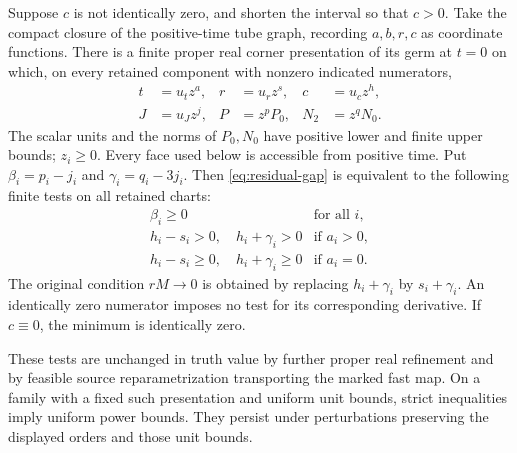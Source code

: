 \begin{theorem}\label{thm:divisorial}
Suppose $c$ is not identically zero, and shorten the interval so that $c>0$.
Take the compact closure of the positive-time tube graph, recording $a,b,r,c$
as coordinate functions. There is a finite proper real corner presentation of
its germ at $t=0$ on which, on every retained component with nonzero indicated
numerators,
\begin{equation}\label{eq:divisor-data}
 \begin{aligned}
 t&=u_t z^a,& r&=u_r z^s,& c&=u_c z^h,\\
 J&=u_J z^j,& P&=z^p P_0,& N_2&=z^q N_0.
 \end{aligned}
\end{equation}
The scalar units and the norms of $P_0,N_0$ have positive lower and finite
upper bounds; $z_i\ge0$. Every face used below is accessible from positive
time. Put $\beta_i=p_i-j_i$ and $\gamma_i=q_i-3j_i$.
Then \eqref{eq:residual-gap} is equivalent to the following finite tests on
all retained charts:
\begin{equation}\label{eq:divisor-tests}
 \begin{array}{ll}
 \beta_i\ge0 &\text{for all }i,\\
 h_i-s_i>0,\quad h_i+\gamma_i>0 &\text{if }a_i>0,\\
 h_i-s_i\ge0,\quad h_i+\gamma_i\ge0 &\text{if }a_i=0.
 \end{array}
\end{equation}
The original condition $rM\to0$ is obtained by replacing $h_i+\gamma_i$
by $s_i+\gamma_i$. An identically zero numerator imposes no test for its
corresponding derivative. If $c\equiv0$, the minimum is identically zero.

These tests are unchanged in truth value by further proper real refinement
and by feasible source reparametrization transporting the marked fast map.
On a family with a fixed such presentation and uniform unit bounds, strict
inequalities imply uniform power bounds. They persist under perturbations
preserving the displayed orders and those unit bounds.
\end{theorem}
